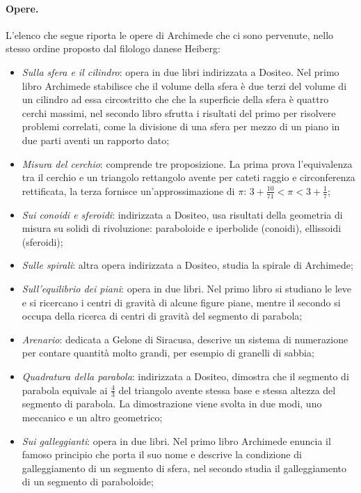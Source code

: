 \paragraph{Opere.} L'elenco che segue riporta le opere di Archimede che ci sono pervenute, nello stesso ordine proposto dal filologo danese Heiberg:
\begin{itemize}
	\item \textit{Sulla sfera e il cilindro}: opera in due libri indirizzata a Dositeo. Nel primo libro Archimede stabilisce che il volume della sfera \`e due terzi del volume di un cilindro ad essa circostritto che che la superficie della sfera \`e quattro cerchi massimi, nel secondo libro sfrutta i risultati del primo per risolvere problemi correlati, come la divisione di una sfera per mezzo di un piano in due parti aventi un rapporto dato;
	\item \textit{Misura del cerchio}: comprende tre proposizione. La prima prova l'equivalenza tra il cerchio e un triangolo rettangolo avente per cateti raggio e circonferenza rettificata, la terza fornisce un'approssimazione di $\pi$: $3 + \frac{10}{71} < \pi < 3 + \frac{1}{7}$;
	\item \textit{Sui conoidi e sferoidi}: indirizzata a Dositeo, usa risultati della geometria di misura su solidi di rivoluzione: paraboloide e iperbolide (conoidi), ellissoidi (sferoidi);
	\item \textit{Sulle spirali}: altra opera indirizzata a Dositeo, studia la spirale di Archimede;
	\item \textit{Sull'equilibrio dei piani}: opera in due libri. Nel primo libro si studiano le leve e si ricercano i centri di gravit\`a di alcune figure piane, mentre il secondo si occupa della ricerca di centri di gravit\`a del segmento di parabola;
	\item \textit{Arenario}: dedicata a Gelone di Siracusa, descrive un sistema di numerazione per contare quantit\`a molto grandi, per esempio di granelli di sabbia;
	\item \textit{Quadratura della parabola}: indirizzata a Dositeo, dimostra che il segmento di parabola equivale ai $\frac{4}{3}$ del triangolo avente stessa base e stessa altezza del segmento di parabola. La dimostrazione viene svolta in due modi, uno meccanico e un altro geometrico;
	\item \textit{Sui galleggianti}: opera in due libri. Nel primo libro Archimede enuncia il famoso principio che porta il suo nome e descrive la condizione di galleggiamento di un segmento di sfera, nel secondo studia il galleggiamento di un segmento di paraboloide;

\end{itemize}
